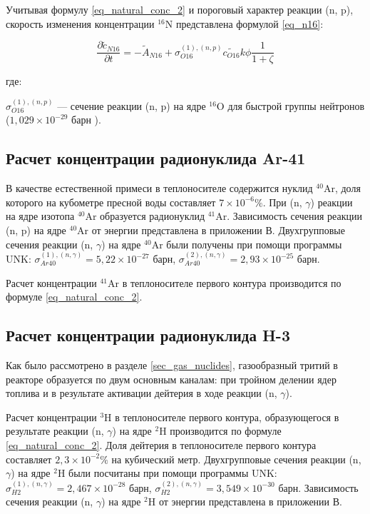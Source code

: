 Учитывая формулу \ref{eq_natural_conc_2} и пороговый характер реакции (n, p), скорость изменения концентрации 
$^{16}\text{N}$ представлена формулой \ref{eq_n16}:

\begin{equation}
    \label{eq_n16}
    \frac{\partial \widetilde{c}_{N16}}{\partial t} = -\widetilde{A}_{N16} + \sigma_{O16}^{(1), (n, p)} \widetilde{c_{O16}}
        k \phi \frac{1}{1 + \zeta}
\end{equation}

где:
\begin{description}
    \item $\sigma_{O16}^{(1), (n, p)}$ --- сечение реакции (n, p) на ядре $^{16}\text{O}$ для быстрой группы нейтронов 
        ($1,029 \times 10^{-29}$ барн \cite{unk}).
\end{description}

\subsection{Расчет концентрации радионуклида Ar-41}

В качестве естественной примеси в теплоносителе содержится нуклид $^{40}\text{Ar}$, доля которого на кубометре пресной 
воды составляет $7 \times 10^{-6} \%$. При (n, $\gamma$) реакции на ядре изотопа $^{40}\text{Ar}$ образуется радионуклид 
$^{41}\text{Ar}$. Зависимость сечения реакции (n, p) на ядре $^{40}\text{Ar}$ от энергии представлена в 
приложении В. Двухгрупповые сечения реакции (n, $\gamma$) на ядре $^{40}\text{Ar}$ были получены при помощи программы 
UNK: 
$\sigma_{Ar40}^{(1), (n, \gamma)} = 5,22 \times 10^{-27}$ барн, 
$\sigma_{Ar40}^{(2), (n, \gamma)} = 2,93 \times 10^{-25}$ барн.

Расчет концентрации $^{41}\text{Ar}$ в теплоносителе первого контура производится по формуле \ref{eq_natural_conc_2}.

\subsection{Расчет концентрации радионуклида H-3}

Как было рассмотрено в разделе \ref{sec_gas_nuclides}, газообразный тритий в реакторе образуется по двум основным 
каналам: при тройном делении ядер топлива и в результате активации дейтерия в ходе реакции (n, $\gamma$). 

Расчет концентрации $^{3}\text{H}$ в теплоносителе первого контура, образующегося в результате реакции (n, $\gamma$) на 
ядре $^{2}\text{H}$ производится по формуле \ref{eq_natural_conc_2}. Доля дейтерия в теплоносителе первого контура 
составляет $2,3 \times 10^{-2} \%$ на кубический метр. Двухгрупповые сечения реакции (n, $\gamma$) на ядре 
$^{2}\text{H}$ были посчитаны при помощи программы UNK: 
$\sigma_{H2}^{(1), (n, \gamma)} = 2,467 \times 10^{-28}$ барн, 
$\sigma_{H2}^{(2), (n, \gamma)} = 3,549 \times 10^{-30}$ барн. 
Зависимость сечения реакции (n, $\gamma$) на ядре $^{2}\text{H}$ от энергии представлена в приложении В.

